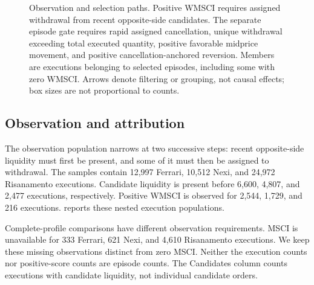\documentclass[11pt]{article}
\begin{document}
\begin{figure}[!htbp]
\begin{singlespace}
    \end{singlespace}
    \caption{Observation and selection paths. Positive WMSCI requires assigned withdrawal from recent opposite-side candidates. The separate episode gate requires rapid assigned cancellation, unique withdrawal exceeding total executed quantity, positive favorable midprice movement, and positive cancellation-anchored reversion. Members are executions belonging to selected episodes, including some with zero WMSCI. Arrows denote filtering or grouping, not causal effects; box sizes are not proportional to counts.}
    \label{fig:results_selection_map}
\end{figure}

\subsection{Observation and attribution}
\label{subsec:observation_attribution_results}
\label{subsec:cross_instrument_results}
\label{subsec:risanamento_results}
\label{subsec:nexi_results}
\label{subsec:ferrari_results}

The observation population narrows at two successive steps: recent opposite-side liquidity must first be present, and some of it must then be assigned to withdrawal. The samples contain 12,997 Ferrari, 10,512 Nexi, and 24,972 Risanamento executions. Candidate liquidity is present before 6,600, 4,807, and 2,477 executions, respectively. Positive WMSCI is observed for 2,544, 1,729, and 216 executions.  reports these nested execution populations.

Complete-profile comparisons have different observation requirements. MSCI is unavailable for 333 Ferrari, 621 Nexi, and 4,610 Risanamento executions. We keep these missing observations distinct from zero MSCI. Neither the execution counts nor positive-score counts are episode counts. The Candidates column counts executions with candidate liquidity, not individual candidate orders.
\end{document}
